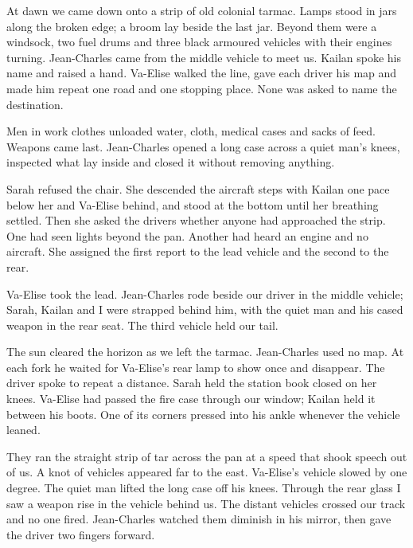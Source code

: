 \ornament

At dawn we came down onto a strip of old colonial tarmac. Lamps stood in jars along the broken edge; a broom lay beside the last jar. Beyond them were a windsock, two fuel drums and three black armoured vehicles with their engines turning. Jean-Charles came from the middle vehicle to meet us. Kailan spoke his name and raised a hand. Va-Elise walked the line, gave each driver his map and made him repeat one road and one stopping place. None was asked to name the destination.\par

Men in work clothes unloaded water, cloth, medical cases and sacks of feed. Weapons came last. Jean-Charles opened a long case across a quiet man's knees, inspected what lay inside and closed it without removing anything.\par

Sarah refused the chair. She descended the aircraft steps with Kailan one pace below her and Va-Elise behind, and stood at the bottom until her breathing settled. Then she asked the drivers whether anyone had approached the strip. One had seen lights beyond the pan. Another had heard an engine and no aircraft. She assigned the first report to the lead vehicle and the second to the rear.\par

Va-Elise took the lead. Jean-Charles rode beside our driver in the middle vehicle; Sarah, Kailan and I were strapped behind him, with the quiet man and his cased weapon in the rear seat. The third vehicle held our tail.\par

The sun cleared the horizon as we left the tarmac. Jean-Charles used no map. At each fork he waited for Va-Elise's rear lamp to show once and disappear. The driver spoke to repeat a distance. Sarah held the station book closed on her knees. Va-Elise had passed the fire case through our window; Kailan held it between his boots. One of its corners pressed into his ankle whenever the vehicle leaned.\par

They ran the straight strip of tar across the pan at a speed that shook speech out of us. A knot of vehicles appeared far to the east. Va-Elise's vehicle slowed by one degree. The quiet man lifted the long case off his knees. Through the rear glass I saw a weapon rise in the vehicle behind us. The distant vehicles crossed our track and no one fired. Jean-Charles watched them diminish in his mirror, then gave the driver two fingers forward.\par

